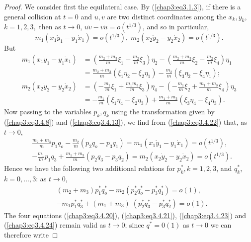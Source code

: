 \begin{proof}
We consider first the equilateral case. By (\ref{chap3:eq3.1.3}), if
there is a general collision at $t = 0$ and $u,v$ are two distinct
coordinates among the $x_k, y_k$, $k = 1,2,3,$ then as $t \to 0$,
$u\dot{v} - v \dot{u} = o (t^{1/3})$, and so in particular, 
\begin{equation*}
m_1 (x_1 \dot{y}_1 - y_1 \dot{x}_1) = o (t^{1/3}), \; m_2 (x_2
\dot{y}_2 - y_2 \dot{x}_2) = o(t^{1/3})
. \tag{3.4.22}\label{chap3:eq3.4.22} 
\end{equation*}
But
\begin{align*}
m_1 (x_1 \dot{y}_1 - y_1 \dot{x}_1) & = \left(\frac{m_2 + m_3}{m}
\xi_1 - \frac{m_2}{m} \xi_3 \right) \eta_2 - \left( \frac{m_2 +
  m_3}{m} \xi_2 - \frac{m_2}{m} \xi_4\right) \eta_1 \\ 
& = \frac{m_2 + m_3}{m} (\xi_1 \eta_2 - \xi_2 \eta_1) - \frac{m_2}{m}
(\xi_3 \eta_2 - \xi_4 \eta_1);\\ 
m_2 (x_2 \dot{y}_2 - y_2 \dot{x}_2) & = \left(-\frac{m_1}{m} \xi_1 +
\frac{m_1 m_3}{m} \xi_3 \right) \eta_4 - \left(-\frac{m_1}{m} \xi_2 +
\frac{m_1 + m_3}{m}  \xi_4\right) \eta_3\\ 
& = - \frac{m_1}{m} (\xi_1 \eta_4 - \xi_2 \eta_3) + \frac{m_1 +
  m_3}{m} (\xi_3 \eta_4 - \xi_4 \eta_3).  
\end{align*}
Now passing to the variables $p_k, q_k$ using the transformation given
by (\ref{chap3:eq3.4.8}) and (\ref{chap3:eq3.4.13}), we find from
(\ref{chap3:eq3.4.22}) that, as $t \to 0$, 
\begin{align*}
& \frac{m_2 + m_3}{m} p_1 q_o - \frac{m_2}{m} (p_2 q_o - p_3 q_1) =
  m_1 (x_1 \dot{y}_1 - y_1 \dot{x}_1)  = o (t^{1/3}),\\ 
& - \frac{m_1}{m} p_1 q_3 + \frac{m_1 + m_3}{m} (p_2 q_3 - p_3 q_2) =
  m_2 (x_2 \dot{y}_2 - y_2 \dot{x}_2) = o (t^{1/3}).  
\end{align*}
Hence we have the following two additional relations for $p^*_k,
k=1,2,3$, and $q^*_k$, $k = 0, \ldots, 3$: as $t \to 0$, 
\begin{align*}
& (m_2 + m_3) p^*_1 q^*_o - m_2 (p^*_2 q^*_o - p^*_3 q^*_1) = o(1),
  \tag{3.4.23}\label{chap3:eq3.4.23}\\ 
& - m_1 p^*_1 q^*_3 + (m_1 + m_3) \; (p^*_2 q^*_3 - p^*_3 q^*_2) = o
  (1). \tag{3.4.24}\label{chap3:eq3.4.24} 
\end{align*}\pageoriginale
The four equations (\ref{chap3:eq3.4.20}), (\ref{chap3:eq3.4.21}),
(\ref{chap3:eq3.4.23}) and (\ref{chap3:eq3.4.24}) remain valid as $t
\to 0$; since $q^* = 0(1)$ as $t \to 0$ we can therefore write

\end{proof}
